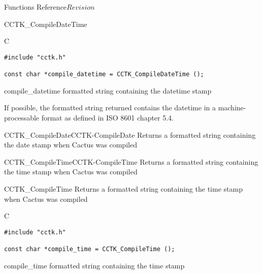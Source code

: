 \begin{cactuspart}{ Functions Reference}{}{$Revision$}
\begin{FunctionDescription}{CCTK\_CompileDateTime}
\begin{SynopsisSection}
\begin{Synopsis}{C}
\begin{verbatim}
#include "cctk.h"

const char *compile_datetime = CCTK_CompileDateTime ();
\end{verbatim}
\end{Synopsis}
\end{SynopsisSection}

\begin{ResultSection}
\begin{Result}{compile\_datetime}
formatted string containing the datetime stamp
\end{Result}
\end{ResultSection}

\begin{Discussion}
If possible, the formatted string returned contains the datetime in a
machine-processable format as defined in ISO 8601 chapter 5.4.
\end{Discussion}

\begin{SeeAlsoSection}
\begin{SeeAlso2}{CCTK\_CompileDate}{CCTK-CompileDate}
  Returns a formatted string containing the date stamp when Cactus was compiled
\end{SeeAlso2}
\begin{SeeAlso2}{CCTK\_CompileTime}{CCTK-CompileTime}
  Returns a formatted string containing the time stamp when Cactus was compiled
\end{SeeAlso2}
\end{SeeAlsoSection}
\end{FunctionDescription}

\begin{FunctionDescription}{CCTK\_CompileTime}
\label{CCTK-CompileTime}
Returns a formatted string containing the time stamp when Cactus was compiled

\begin{SynopsisSection}
\begin{Synopsis}{C}
\begin{verbatim}
#include "cctk.h"

const char *compile_time = CCTK_CompileTime ();
\end{verbatim}
\end{Synopsis}
\end{SynopsisSection}

\begin{ResultSection}
\begin{Result}{compile\_time}
formatted string containing the time stamp
\end{Result}
\end{ResultSection}


\end{FunctionDescription}
\end{cactuspart}
